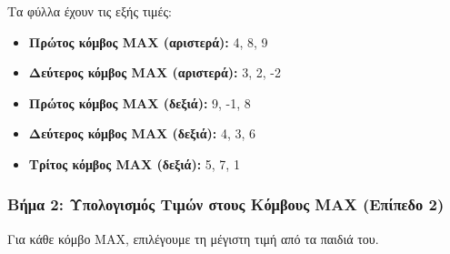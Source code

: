 \documentclass{article}
\begin{document}
Τα φύλλα έχουν τις εξής τιμές:

\begin{itemize}
    \item \textbf{Πρώτος κόμβος MAX (αριστερά):} 4, 8, 9
    \item \textbf{Δεύτερος κόμβος MAX (αριστερά):} 3, 2, -2
    \item \textbf{Πρώτος κόμβος MAX (δεξιά):} 9, -1, 8
    \item \textbf{Δεύτερος κόμβος MAX (δεξιά):} 4, 3, 6
    \item \textbf{Τρίτος κόμβος MAX (δεξιά):} 5, 7, 1
\end{itemize}

\subsubsection*{Βήμα 2: Υπολογισμός Τιμών στους Κόμβους MAX (Επίπεδο 2)}

Για κάθε κόμβο MAX, επιλέγουμε τη μέγιστη τιμή από τα παιδιά του.
\end{document}
